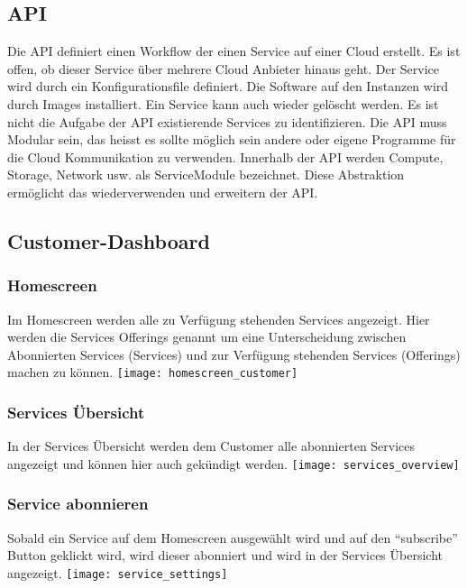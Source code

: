 \subsection{API}
Die API definiert einen Workflow der einen Service auf einer Cloud erstellt. Es ist offen, ob 
dieser Service über mehrere Cloud Anbieter hinaus geht. Der Service wird durch 
ein Konfigurationsfile definiert. Die Software auf den Instanzen wird durch Images installiert.
 Ein Service kann auch wieder gelöscht werden.
 Es ist nicht die Aufgabe der API existierende Services zu identifizieren. 
 Die API muss Modular sein, das heisst es sollte möglich sein andere oder eigene 
 Programme für die Cloud Kommunikation zu verwenden. Innerhalb der API 
 werden Compute, Storage, Network usw. als ServiceModule bezeichnet. 
 Diese Abstraktion ermöglicht das wiederverwenden und erweitern der API.
\newpage
\subsection{Customer-Dashboard}
\subsubsection{Homescreen}
Im Homescreen werden alle zu 
Verfügung stehenden Services angezeigt.
Hier werden die Services Offerings genannt um eine Unterscheidung zwischen 
Abonnierten Services (Services) und zur Verfügung stehenden Services (Offerings) 
machen zu können.
\newline
\texttt{[image: homescreen\_customer]}

\subsubsection{Services Übersicht}
In der Services Übersicht werden dem Customer alle abonnierten Services 
angezeigt und können hier auch gekündigt werden.
\newline
\texttt{[image: services\_overview]}


\subsubsection{Service abonnieren}
Sobald ein Service auf dem Homescreen ausgewählt wird und auf den ``subscribe'' 
Button geklickt wird, wird dieser abonniert und wird in der Services Übersicht 
angezeigt.
\newline
\texttt{[image: service\_settings]}


